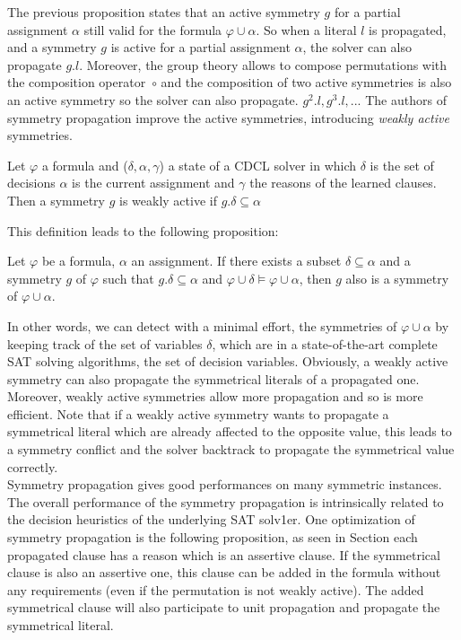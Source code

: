 The previous proposition states that an active symmetry $g$ for a partial assignment $\alpha$ still valid for
the formula $\varphi \cup \alpha$. So when a literal $l$ is propagated, and a symmetry $g$ is active for a
partial assignment $\alpha$, the solver can also propagate $g.l$. 
Moreover, the group theory allows to compose permutations with the composition operator~$\circ$ and the composition of two active symmetries is also an active symmetry so the solver can also propagate. $g^2.l, g^3.l, ... $
The authors of symmetry propagation improve the active symmetries, introducing \emph{weakly active} symmetries.
\begin{definition}
 \label{def:weakly_active_symmetry}
 Let $\varphi$ a formula and ($\delta, \alpha, \gamma$) a state of a CDCL solver in which $\delta$ is the set of decisions
 $\alpha$ is the current assignment and $\gamma$ the reasons of the learned clauses. Then a symmetry $g$ is weakly active 
 if $g.\delta \subseteq \alpha$
\end{definition}
This definition leads to the following proposition:
\begin{proposition}
 Let $\varphi$ be a formula, $\alpha $ an assignment. If
 there exists a subset $\delta \subseteq \alpha $ and a symmetry $g$ of $\varphi$ such that 
 $g.\delta \subseteq \alpha $ and $\varphi \cup \delta \models \varphi \cup \alpha$, then $g$ 
 also is a symmetry of $\varphi \cup \alpha $.
\end{proposition}
In other words, we can detect with a minimal effort, the symmetries of $\varphi
\cup \alpha$ by keeping track of the set of variables $\delta$, which are 
in a state-of-the-art complete SAT solving algorithms, the set of decision variables.
Obviously, a weakly active symmetry can also propagate the symmetrical literals of a propagated one.
Moreover, weakly active symmetries allow more propagation and so is more efficient.
Note that if a weakly active symmetry wants to propagate a symmetrical literal which are already affected to the 
opposite value, this leads to a symmetry conflict and the solver backtrack to propagate the symmetrical value correctly.
\\
Symmetry propagation gives good performances on many symmetric instances.
The overall performance of the symmetry propagation is intrinsically related to the decision heuristics of
the underlying SAT solv1er.
One optimization of symmetry propagation is the following proposition, as seen in Section
 each propagated clause has a reason which is an assertive clause.
If the symmetrical clause is also an assertive one, this clause can be added in the formula without any requirements
(even if the permutation is not weakly active). The added symmetrical clause will also participate to unit propagation and propagate the symmetrical literal.

